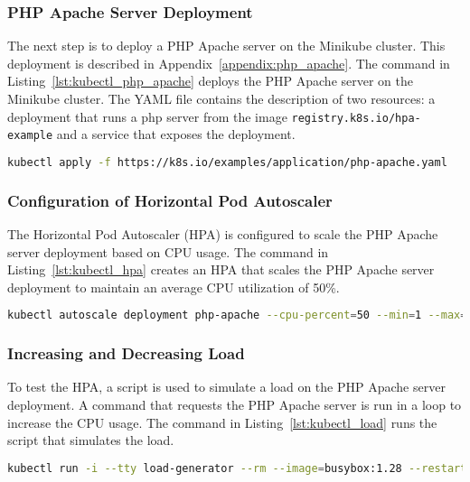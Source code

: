 \subsubsection{PHP Apache Server Deployment}
The next step is to deploy a PHP Apache server on the Minikube cluster.
This deployment is described in Appendix~\ref{appendix:php_apache}.
The command in Listing~\ref{lst:kubectl_php_apache} deploys the PHP Apache server on the Minikube cluster.
The YAML file contains the description of two resources: a deployment that runs a php server from the image \texttt{registry.k8s.io/hpa-example} and a service that exposes the deployment.

\begin{lstlisting}[language=bash, label={lst:kubectl_php_apache},caption={Deploying the PHP Apache server}]
  kubectl apply -f https://k8s.io/examples/application/php-apache.yaml
\end{lstlisting}

\subsubsection{Configuration of Horizontal Pod Autoscaler}
The Horizontal Pod Autoscaler (HPA) is configured to scale the PHP Apache server deployment based on CPU usage.
The command in Listing~\ref{lst:kubectl_hpa} creates an HPA that scales the PHP Apache server deployment to maintain an average CPU utilization of 50\%.

\begin{lstlisting}[language=bash, label={lst:kubectl_hpa},caption={Configuring the Horizontal Pod Autoscaler}]
  kubectl autoscale deployment php-apache --cpu-percent=50 --min=1 --max=10
\end{lstlisting}


\subsubsection{Increasing and Decreasing Load}
To test the HPA, a script is used to simulate a load on the PHP Apache server deployment.
A command that requests the PHP Apache server is run in a loop to increase the CPU usage.
The command in Listing~\ref{lst:kubectl_load} runs the script that simulates the load.

\begin{lstlisting}[language=bash, label={lst:kubectl_load},caption={Simulating the load}]
  kubectl run -i --tty load-generator --rm --image=busybox:1.28 --restart=Never -- /bin/sh -c "while sleep 0.01; do wget -q -O- http://php-apache; done"

\end{lstlisting}

